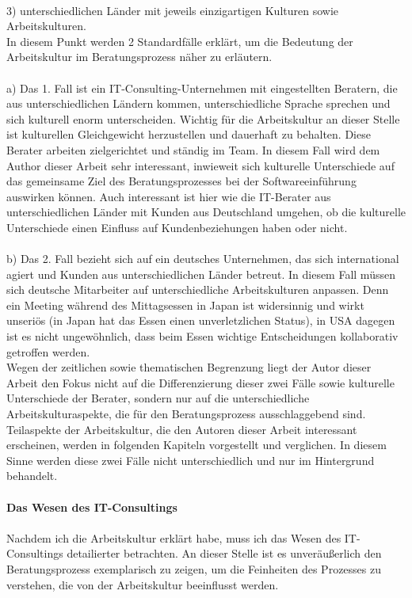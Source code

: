 \\
	3) unterschiedlichen Länder mit jeweils einzigartigen Kulturen sowie Arbeitskulturen.\\
	 In diesem Punkt werden 2 Standardfälle erklärt, um die Bedeutung der Arbeitskultur im Beratungsprozess näher zu erläutern.\\
	 \\
	 a) Das 1. Fall ist ein IT-Consulting-Unternehmen mit eingestellten Beratern, die aus unterschiedlichen Ländern kommen, unterschiedliche Sprache sprechen und sich kulturell enorm unterscheiden. Wichtig für die Arbeitskultur an dieser Stelle ist kulturellen Gleichgewicht herzustellen und dauerhaft zu behalten. Diese Berater arbeiten zielgerichtet und ständig im Team. In diesem Fall wird dem Author dieser Arbeit sehr interessant, inwieweit sich kulturelle Unterschiede auf das gemeinsame Ziel des Beratungsprozesses bei der Softwareeinführung auswirken können. Auch interessant ist hier wie die IT-Berater aus unterschiedlichen Länder mit Kunden aus Deutschland umgehen, ob die kulturelle Unterschiede einen Einfluss auf Kundenbeziehungen haben oder nicht. \\
	 \\
	 b) Das 2. Fall bezieht sich auf ein deutsches Unternehmen, das sich international agiert und Kunden aus unterschiedlichen Länder betreut. In diesem Fall müssen sich deutsche Mitarbeiter auf unterschiedliche Arbeitskulturen anpassen. Denn ein Meeting während des Mittagsessen in Japan ist widersinnig und wirkt unseriös (in Japan hat das Essen einen unverletzlichen Status), in USA dagegen ist es nicht ungewöhnlich, dass beim Essen wichtige Entscheidungen kollaborativ getroffen werden.\\
	Wegen der zeitlichen sowie thematischen Begrenzung liegt der Autor dieser Arbeit den Fokus nicht auf die Differenzierung dieser zwei Fälle sowie kulturelle Unterschiede der Berater, sondern nur auf die unterschiedliche Arbeitskulturaspekte, die für den Beratungsprozess ausschlaggebend sind. Teilaspekte der Arbeitskultur, die den Autoren dieser Arbeit interessant erscheinen, werden in folgenden Kapiteln vorgestellt und verglichen. In diesem Sinne werden diese zwei Fälle nicht unterschiedlich und nur im Hintergrund behandelt.\\
	\\
\textbf{Das Wesen des IT-Consultings}\\ \\
	Nachdem ich die Arbeitskultur erklärt habe, muss ich das Wesen des IT-Consultings detailierter betrachten. An dieser Stelle ist es unveräußerlich den Beratungsprozess exemplarisch zu zeigen, um die Feinheiten des Prozesses zu verstehen, die von der Arbeitskultur beeinflusst werden.
